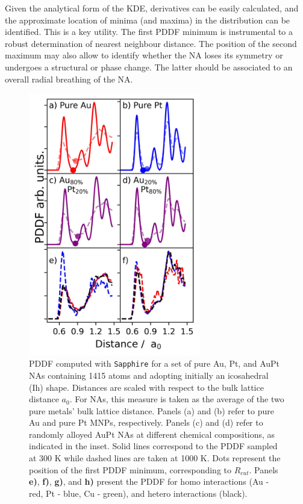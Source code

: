 Given the analytical form of the KDE, derivatives can be easily calculated, and the approximate location of minima (and maxima) in the distribution can be identified. This is a key utility. 
%
The first PDDF minimum is instrumental to a robust determination of nearest neighbour distance. 
The position of the second maximum may also allow to identify whether the NA loses its symmetry or undergoes a structural or phase change. The latter should be associated to an overall radial breathing of the NA. 
%
\begin{figure}[ht!]
    \centering
    \includegraphics[width=7.5cm]{figures/Sapphire/pddf.jpeg}
    \caption{
    PDDF computed with \texttt{Sapphire} for a set of pure Au, Pt, and AuPt NAs containing 1415 atoms and adopting initially an icosahedral (Ih) shape.
    Distances are scaled with respect to the bulk lattice distance $a_{0}$. For NAs, this measure is taken as the average of the two pure metals' bulk lattice distance. Panels (a) and (b) refer to pure Au and pure Pt MNPs, respectively. Panels (c) and (d) refer to randomly alloyed AuPt NAs at different chemical compositions, as indicated in the inset. Solid lines correspond to the PDDF sampled at 300 K while dashed lines are taken at 1000 K. Dots represent the position of the first PDDF minimum, corresponding to $R_{cut}$. Panels \textbf{e)}, \textbf{f)}, \textbf{g)}, and \textbf{h)} present the PDDF for homo interactions (Au - red, Pt - blue, Cu - green), and hetero interactions (black).}
    \label{fig:pddf}
\end{figure}

